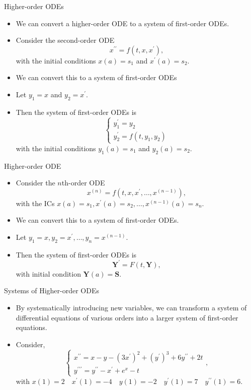 \documentclass{beamer}
\begin{document}
\begin{frame}{Higher-order ODEs}
    \begin{itemize}
        \item We can convert a higher-order ODE to a system of first-order ODEs.
        \item Consider the second-order ODE
        \[
        x^{\prime \prime}=f(t, x, x^{\prime}),
        \]
        with the initial conditions $x(a)=s_1$ and $x^{\prime}(a)=s_2$.
        \item We can convert this to a system of first-order ODEs
        \item Let $y_1=x$ and $y_2=x^{\prime}$.
        \item Then the system of first-order ODEs is
        \[
        \left\{\begin{array}{l}
            y_1^{\prime}=y_2 \\
            y_2^{\prime}=f(t, y_1, y_2)
            \end{array}\right.
            \]
            with the initial conditions $y_1(a)=s_1$ and $y_2(a)=s_2$.
    
    \end{itemize}
\end{frame}
\begin{frame}{Higher-order ODE}
    \begin{itemize}
        \item Consider the $n$th-order ODE  
        \[  
        x^{(n)}=f(t, x, x^{\prime}, \ldots, x^{(n-1)}),
        \]
        with the ICs $x(a)=s_1, x^{\prime}(a)=s_2, \ldots, x^{(n-1)}(a)=s_n$.

        \item We can convert this to a system of first-order ODEs.
        \item Let $y_1=x, y_2=x^{\prime}, \ldots, y_n=x^{(n-1)}$.
        \item Then the system of first-order ODEs is
\[
\mathbf{Y}^{\prime}=F(t, \mathbf{Y}), 
\]
with initial condition $\mathbf{Y}(a)=\mathbf{S}$.
    \end{itemize}

\end{frame}
\begin{frame}{Systems of Higher-order ODEs}
    \begin{itemize}
        \item By systematically introducing new variables, we can transform a system of differential
        equations of various orders into a larger system of first-order equations.
        \item Consider, 
        $$
\left\{\begin{array}{l}
x^{\prime \prime}=x-y-\left(3 x^{\prime}\right)^2+\left(y^{\prime}\right)^3+6 y^{\prime \prime}+2 t \\
y^{\prime \prime \prime}=y^{\prime \prime}-x^{\prime}+e^x-t 
\end{array}\right.,
$$
with $x(1)=2 \quad x^{\prime}(1)=-4 \quad y(1)=-2 \quad y^{\prime}(1)=7 \quad y^{\prime \prime}(1)=6$.

    \end{itemize}
\end{frame}
\end{document}
